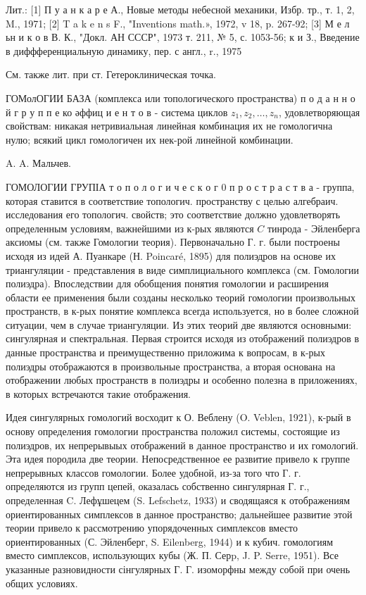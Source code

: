 \documentclass[10pt]{article}
\begin{document}
Лит.: [1] П у а н к а р е А., Новые методы небесной механики, Избр. тр., т. 1, 2, M., 1971; [2] T a k e n s F., "Inventions math.», 1972, v 18, p. 267-92; [3] М е л ьн и к о в В. К., "Докл. АН СССР", 1973 т. 211, № 5, с. 1053-56; к и З., Введение в диффференциальную динамику, пер. с англ., r., 1975



См. также лит. при ст. Гетероклиническая точка.



ГОМолОГИИ БАЗА (комплекса или топологического пространства) п о д а н н о й г р у п п е ко әффиц и е н т о в - система циклов $z_{1}, z_{2}, \ldots, z_{n}$, удовлетворяющая свойствам: никакая нетривиальная линейная комбинация их не гомологична нулю; всякий цикл гомологичен их нек-рой линейной комбинации.



A. A. Мальчев.



ГОМОЛОГИИ ГРУПІА т о п о л о г и ч е с к о г 0 п р о с т р а с т в а - группа, которая ставится в соответствие топологич. пространству с целью алгебраич. исследования его топологич. свойств; это соответствие должно удовлетворять определенным условиям, важнейшими из к-рых являются $C$ тинрода - Эйленберга аксиомы (см. также Гомологии теория). Первоначально Г. г. были построены исходя из идей А. Пуанкаре (Н. Poincaré, 1895) для полиэдров на основе их триангуляции - представления в виде симплициального комплекса (см. Гомологии полиэдра). Впоследствии для обобщения понятия гомологии и расширения области ее применения были созданы несколько теорий гомологии произвольных пространств, в к-рых понятие комплекса всегда используется, но в более сложной ситуации, чем в случае триангуляции. Из этих теорий две являются основными: сингулярная и спектральная. Первая строится исходя из отображений полиэдров в данные пространства и преимущественно приложима к вопросам, в к-рых полиэдры отображаются в произвольные пространства, а вторая основана на отображении любых пространств в полиэдры и особенно полезна в приложениях, в которых встречаются такие отображения.



Идея сингулярных гомологий восходит к О. Веблену (O. Veblen, 1921), к-рый в основу определения гомологии пространства положил системы, состоящие из полиэдров, их непрерывыых отображений в данное пространство и их гомологий. Эта идея породила две теории. Непосредственное ее развитие привело к группе непрерывных классов гомологии. Более удобной, из-за того что Г. г. определяются из групп цепей, оказалась собственно сингулярная Г. г., определенная C. Лефұшецем (S. Lefschetz, 1933) и сводящаяся к отображениям ориентированных симплексов в данное пространство; дальнейшее развитие этой теории привело к рассмотрению упорядоченных симплексов вместо ориентированных (С. Эйленберг, S. Eilenberg, 1944) и к кубич. гомологиям вместо симплексов, использующих кубы (Ж. П. Серp, J. P. Serre, 1951). Все указанные разновидности сінгулярных Г. Г. изоморфны между собой при очень общих условиях.
\end{document}
